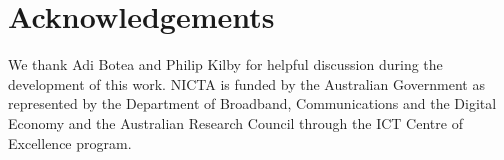 \section{Acknowledgements}
\label{sec::ack}
We thank Adi Botea and Philip Kilby for helpful discussion during the
development of this work.  
NICTA is funded by the Australian Government as
represented by the Department of Broadband, Communications and the Digital
Economy and the Australian Research Council through the ICT Centre of
Excellence program.
